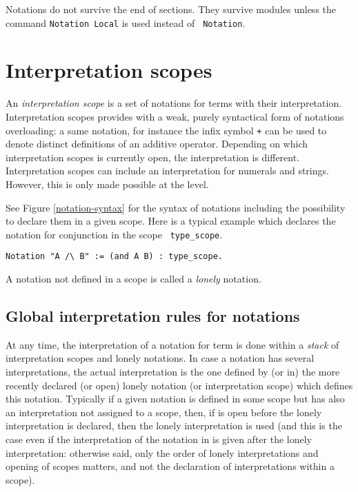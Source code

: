 Notations do not survive the end of sections. They survive modules
unless the command {\tt Notation Local} is used instead of {\tt
Notation}.

\section[Interpretation scopes]{Interpretation scopes
\label{scopes}}

An {\em interpretation scope} is a set of notations for terms with
their interpretation. Interpretation scopes provides with a weak,
purely syntactical form of notations overloading: a same notation, for
instance the infix symbol \verb=+= can be used to denote distinct
definitions of an additive operator. Depending on which interpretation
scopes is currently open, the interpretation is different.
Interpretation scopes can include an interpretation for
numerals and strings. However, this is only made possible at the
{\ocaml} level.

See Figure \ref{notation-syntax} for the syntax of notations including
the possibility to declare them in a given scope.  Here is a typical
example which declares the notation for conjunction in the scope {\tt
type\_scope}.

\begin{verbatim}
Notation "A /\ B" := (and A B) : type_scope.
\end{verbatim}

\Rem A notation not defined in a scope is called a {\em lonely} notation.

\subsection{Global interpretation rules for notations}

At any time, the interpretation of a notation for term is done within
a {\em stack} of interpretation scopes and lonely notations. In case a
notation has several interpretations, the actual interpretation is the
one defined by (or in) the more recently declared (or open) lonely
notation (or interpretation scope) which defines this notation.
Typically if a given notation is defined in some scope {\scope} but
has also an interpretation not assigned to a scope, then, if {\scope}
is open before the lonely interpretation is declared, then the lonely
interpretation is used (and this is the case even if the
interpretation of the notation in {\scope} is given after the lonely
interpretation: otherwise said, only the order of lonely
interpretations and opening of scopes matters, and not the declaration
of interpretations within a scope).

